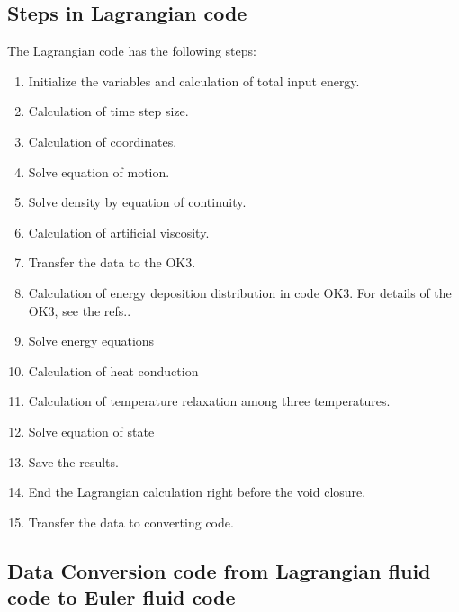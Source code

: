 \subsection{Steps in Lagrangian code}\par
     The Lagrangian code has the following steps: 

\begin{enumerate}
\item Initialize the variables and calculation of total input energy. \par
\item Calculation of time step size.\par
\item Calculation of coordinates.\par
\item Solve equation of motion. \par
\item Solve density by equation of continuity.\par
\item Calculation of artificial viscosity.\par
\item Transfer the data to the OK3. \par
\item Calculation of energy deposition distribution in code OK3. For details of the OK3, see the refs.\cite{ogoyski1,ogoyski2,ogoyski3}. \par
\item Solve energy equations\par
\item Calculation of heat conduction\par
\item Calculation of temperature relaxation among three temperatures.\par
\item Solve equation of state\par
\item Save the results.\par
\item End the Lagrangian calculation right before the void closure.\par
\item Transfer the data to converting code. \par
\end {enumerate}


\subsection{Data Conversion code from Lagrangian fluid code to Euler fluid code}

